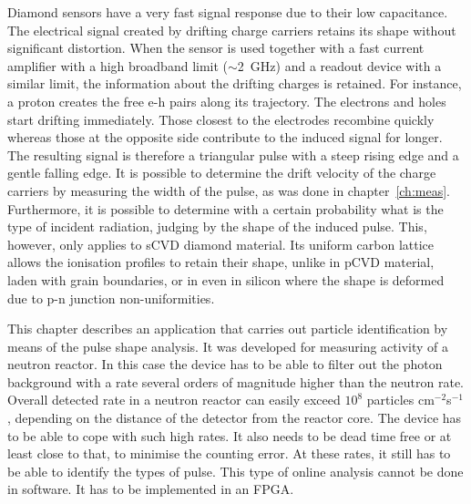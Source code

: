 
\label{ch:cur}

Diamond sensors have a very fast signal response due to their low capacitance. The electrical signal created by drifting charge carriers retains its shape without significant distortion. When the sensor is used together with a fast current amplifier with a high broadband limit ($\sim$2~GHz) and a readout device with a similar limit, the information about the drifting charges is retained. For instance, a proton creates the free e-h pairs along its trajectory. The electrons and holes start drifting immediately. Those closest to the electrodes recombine quickly whereas those at the opposite side contribute to the induced signal for longer.  The resulting signal is therefore a triangular pulse with a steep rising edge and a gentle falling edge. It is possible to determine the drift velocity of the charge carriers by measuring the width of the pulse, as was done in chapter~\ref{ch:meas}. Furthermore, it is possible to determine with a certain probability what is the type of incident radiation, judging by the shape of the induced pulse. This, however, only applies to sCVD diamond material. Its uniform carbon lattice allows the ionisation profiles to retain their shape, unlike in pCVD material, laden with grain boundaries, or in even in silicon where the shape is deformed due to p-n junction non-uniformities.

This chapter describes an application that carries out particle identification by means of the pulse shape analysis. It was developed for measuring activity of a neutron reactor. In this case the device has to be able to filter out the photon background with a rate several orders of magnitude higher than the neutron rate. Overall detected rate in a neutron reactor can easily exceed $10^8$ particles cm$^{-2}$s$^{-1}$, depending on the distance of the detector from the reactor core. The device has to be able to cope with such high rates. It also needs to be dead time free or at least close to that, to minimise the counting error. At these rates, it still has to be able to identify the types of pulse. This type of online analysis cannot be done in software. It has to be implemented in an FPGA.







